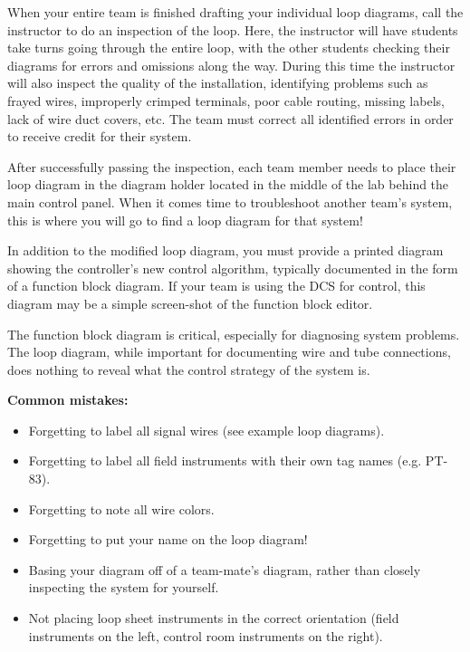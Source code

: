 \documentclass[12pt,a4paper]{article}
\begin{document}
When your entire team is finished drafting your individual loop diagrams, call the instructor to do an inspection of the loop.  Here, the instructor will have students take turns going through the entire loop, with the other students checking their diagrams for errors and omissions along the way.  During this time the instructor will also inspect the quality of the installation, identifying problems such as frayed wires, improperly crimped terminals, poor cable routing, missing labels, lack of wire duct covers, etc.  The team must correct all identified errors in order to receive credit for their system.  

After successfully passing the inspection, each team member needs to place their loop diagram in the diagram holder located in the middle of the lab behind the main control panel.  When it comes time to troubleshoot another team's system, this is where you will go to find a loop diagram for that system!

\vskip 10pt

In addition to the modified loop diagram, you must provide a printed diagram showing the controller's new control algorithm, typically documented in the form of a function block diagram.  If your team is using the DCS for control, this diagram may be a simple screen-shot of the function block editor.

The function block diagram is critical, especially for diagnosing system problems.  The loop diagram, while important for documenting wire and tube connections, does nothing to reveal what the control strategy of the system is. 

\vskip 10pt

{\bf Common mistakes:}

\begin{itemize}
\item{} Forgetting to label all signal wires (see example loop diagrams).
\item{} Forgetting to label all field instruments with their own tag names (e.g. PT-83).
\item{} Forgetting to note all wire colors.
\item{} Forgetting to put your name on the loop diagram!
\item{} Basing your diagram off of a team-mate's diagram, rather than closely inspecting the system for yourself.
\item{} Not placing loop sheet instruments in the correct orientation (field instruments on the left, control room instruments on the right).
\end{itemize}
\end{document}
